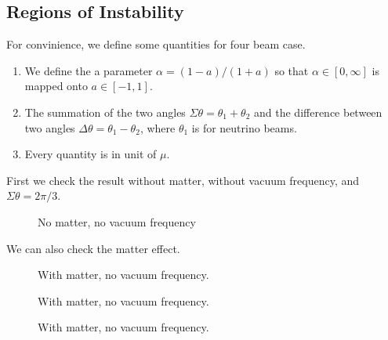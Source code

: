 \documentclass[letterpaper,12pt,english]{sphinxmanual}
\begin{document}
\subsection{Regions of Instability}
\label{\detokenize{collective/fast-modes:regions-of-instability}}
For convinience, we define some quantities for four beam case.
\begin{enumerate}
\item {} 
We define the a parameter \(\alpha=(1-a)/(1+a)\) so that \(\alpha \in [0,\infty]\) is mapped onto \(a\in [-1,1]\).

\item {} 
The summation of the two angles \(\Sigma\theta=\theta_1+\theta_2\) and the difference between two angles \(\Delta\theta=\theta_1-\theta_2\), where \(\theta_1\) is for neutrino beams.

\item {} 
Every quantity is in unit of \(\mu\).

\end{enumerate}

First we check the result without matter, without vacuum frequency, and \(\Sigma\theta=2\pi/3\).
\begin{figure}[htbp]
\centering
\capstart

\noindent{}
\caption{No matter, no vacuum frequency}\label{\detokenize{collective/fast-modes:id4}}\end{figure}

We can also check the matter effect.
\begin{figure}[htbp]
\centering
\capstart

\noindent{}
\caption{With matter, no vacuum frequency.}\label{\detokenize{collective/fast-modes:id5}}\end{figure}
\begin{figure}[htbp]
\centering
\capstart

\noindent{}
\caption{With matter, no vacuum frequency.}\label{\detokenize{collective/fast-modes:id6}}\end{figure}
\begin{figure}[htbp]
\centering
\capstart

\noindent{}
\caption{With matter, no vacuum frequency.}\label{\detokenize{collective/fast-modes:id7}}\end{figure}
\end{document}

